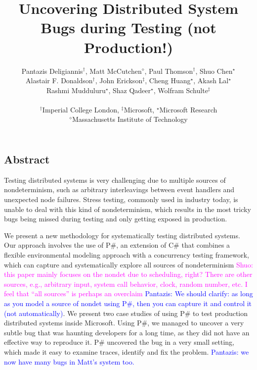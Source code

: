 \documentclass[letterpaper,twocolumn,10pt]{article}
\newcommand{\psharp}{P\#\xspace}
\newcommand{\csharp}{C\#\xspace}
\newcommand{\PDComment}[1]{\textcolor{blue}{Pantazis: #1}}
\newcommand{\SCComment}[1]{\textcolor{magenta}{Shuo: #1}}
\begin{document}
\date{}

\title{\Large \bf Uncovering Distributed System Bugs during Testing (not Production!)}

\author{
{\rm Pantazis Deligiannis$^\dagger$, Matt McCutchen$^\diamond$, Paul Thomson$^\dagger$, Shuo Chen$^\star$}\\
{\rm Alastair F. Donaldson$^\dagger$, John Erickson$^\ddagger$, Cheng Huang$^\star$, Akash Lal$^\star$}\\
{\rm Rashmi Mudduluru$^\star$, Shaz Qadeer$^\star$, Wolfram Schulte$^\ddagger$}\\\\
$^\dagger$Imperial College London, $^\ddagger$Microsoft, $^\star$Microsoft Research\\
$^\diamond$Massachusetts Institute of Technology\\
} %

\maketitle

\thispagestyle{empty}


\subsection*{Abstract}
Testing distributed systems is very challenging due to multiple sources of nondeterminism, such as arbitrary interleavings between event handlers and unexpected node failures. Stress testing, commonly used in industry today, is unable to deal with this kind of nondeterminism, which results in the most tricky bugs being missed during testing and only getting exposed in production.

We present a new methodology for systematically testing distributed systems. Our approach involves the use of \psharp, an extension of \csharp that combines a flexible environmental modeling approach with a concurrency testing framework, which can capture and systematically explore all sources of nondeterminism \SCComment{this paper mainly focuses on the nondet due to scheduling, right? There are other sources, e.g., arbitrary input, system call behavior, clock, random number, etc. I feel that ``all sources'' is perhaps an overclaim} \PDComment{We should clarify: as long as you model a source of nondet using \psharp, then you can capture it and control it (not automatically)}. We present two case studies of using \psharp to test production distributed systems inside Microsoft. Using \psharp, we managed to uncover a very subtle bug that was haunting developers for a long time, as they did not have an effective way to reproduce it. \psharp uncovered the bug in a very small setting, which made it easy to examine traces, identify and fix the problem. \PDComment{we now have many bugs in Matt's system too.}
\end{document}
